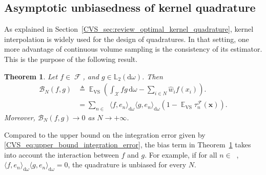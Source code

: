 \documentclass[twoside,11pt]{book}
\newtheorem{theorem}{Theorem}
\numberwithin{theorem}{chapter}
\numberwithin{definition}{chapter}
\numberwithin{proposition}{chapter}
\numberwithin{corollary}{chapter}
\numberwithin{example}{chapter}
\numberwithin{lemma}{chapter}
\numberwithin{assumption}{chapter}
\numberwithin{equation}{chapter}
\numberwithin{figure}{chapter}
\DeclareMathOperator{\VS}{\mathrm{VS}}
\DeclareMathOperator{\EX}{\mathbb{E}}
\DeclareMathOperator{\F}{\mathcal{F}}
\DeclareMathOperator{\X}{\mathcal{X}}
\def\Ltwo{\mathbb{L}_{2}(\mathrm{d} \omega)}
\DeclareMathOperator{\Ns}{\mathbb{N}^{*}}
\newcommand{\pc}[1]{\textcolor{blue}{#1}}
\begin{document}
\subsection{Asymptotic unbiasedness of kernel quadrature}\label{CVS_sec:unbiased_property}
As explained in Section~\ref{CVS_sec:review_optimal_kernel_quadrature}, kernel interpolation is widely used for the design of quadratures.
In that setting, one more advantage of continuous volume sampling is the consistency of its estimator. This is the purpose of the following result.
 \begin{theorem}\label{CVS_thm:EX_VS_integration_error}
Let $f \in \F$, and $g \in \Ltwo$. Then
\begin{align}
\mathcal{B}_{N}(f,g) & \triangleq \EX_{\VS} \left( \int_{\X}fg\,\mathrm{d}\omega -  \sum\limits_{i \in N} \hat{w}_{i}f(x_{i}) \right). \nonumber\\
 & = \sum\limits_{n \in \Ns} \langle f,e_{n} \rangle_{\mathrm{d}\omega} \langle g,e_{n} \rangle_{\mathrm{d}\omega}\left(1- \EX_{\VS}\tau_{n}^{\F}(\bm{x}) \right) . \nonumber%
\end{align}
Moreover,
$\mathcal{B}_{N}(f,g) \rightarrow 0$ as $N \rightarrow +\infty$.
\end{theorem}
Compared to the upper bound on the integration error given by \eqref{CVS_eq:upper_bound_integration_error}, the bias term in Theorem~\ref{CVS_thm:EX_VS_integration_error} takes into account the interaction between $f$ and $g$. For example, if for all $n \in \Ns$, $\langle f,e_{n} \rangle_{\mathrm{d}\omega} \langle g,e_{n} \rangle_{\mathrm{d}\omega} = 0$, the quadrature is unbiased for every $N$.
\end{document}
